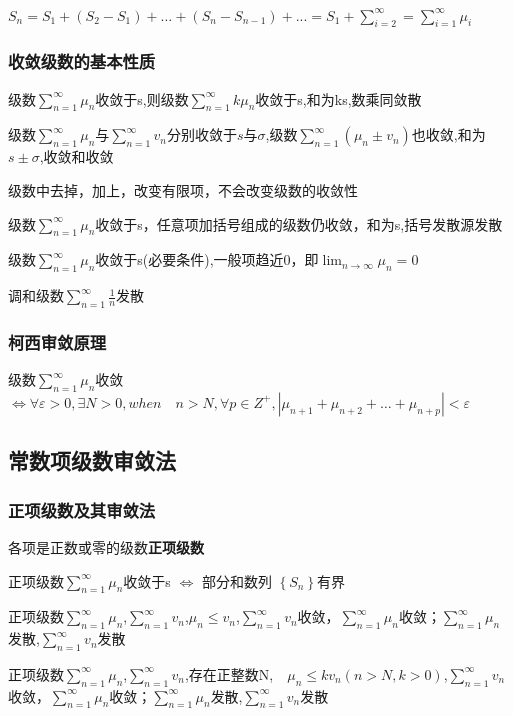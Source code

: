 \documentclass[UTF8]{ctexart}
\newcommand{\mb}[1]{\textbf{#1}}
\newcommand{\mda}[1]{$\displaystyle{ #1 }$}
\newcommand{\mf}[1]{\left( #1\right)}
\newcommand{\mfa}[1]{\left| #1\right|}
\newcommand{\mfb}[1]{\left\{ #1\right\}}
\newcommand{\q}{\quad}
\begin{document}
\mda{S_n=S_1+\mf{S_2-S_1}+\dots+\mf{S_n-S_{n-1}}+...=S_1+\sum_{i=2}^\infty=\sum_{i=1}^\infty \mu_i }

\subsubsection{收敛级数的基本性质}

级数\mda{\sum_{n=1}^\infty\mu_n}收敛于s,则级数\mda{\sum_{n=1}^\infty k\mu_n}收敛于s,和为ks,数乘同敛散

级数\mda{\sum_{n=1}^\infty\mu_n}与\mda{\sum_{n=1}^\infty v_n}分别收敛于$s$与$\sigma$,级数\mda{\sum_{n=1}^\infty \mf{\mu_n \pm v_n}}也收敛,和为$s\pm \sigma$,收敛和收敛

级数中去掉，加上，改变有限项，不会改变级数的收敛性

级数\mda{\sum_{n=1}^\infty\mu_n}收敛于s，任意项加括号组成的级数仍收敛，和为s,括号发散源发散

级数\mda{\sum_{n=1}^\infty\mu_n}收敛于s(必要条件),一般项趋近0，即\mda{\lim_{n \rightarrow \infty}\mu_n=0}

调和级数\mda{\sum_{n=1}^\infty \frac{1}{n}}发散

\subsubsection{柯西审敛原理}

级数\mda{\sum_{n=1}^\infty\mu_n}收敛 $\Leftrightarrow \forall \varepsilon>0,\exists N>0,when \q n>N,\forall p \in Z^+ ,\mfa{\mu_{n+1} +\mu_{n+2}+\dots+\mu_{n+p}}<\varepsilon$

\subsection{常数项级数审敛法}

\subsubsection{正项级数及其审敛法}

各项是正数或零的级数\mb{正项级数}

正项级数\mda{\sum_{n=1}^\infty\mu_n}收敛于s $\Leftrightarrow$ 部分和数列 $\mfb{S_n}$有界

正项级数\mda{\sum_{n=1}^\infty\mu_n},\mda{\sum_{n=1}^\infty v_n},$\mu_n\leqslant v_n$,\mda{\sum_{n=1}^\infty v_n}收敛，\mda{\sum_{n=1}^\infty\mu_n}收敛；\mda{\sum_{n=1}^\infty\mu_n}发散,\mda{\sum_{n=1}^\infty v_n}发散

正项级数\mda{\sum_{n=1}^\infty\mu_n},\mda{\sum_{n=1}^\infty v_n},存在正整数N,$ \q\mu_n\leqslant kv_n\mf{n> N,k>0}$,\mda{\sum_{n=1}^\infty v_n}收敛，\mda{\sum_{n=1}^\infty\mu_n}收敛；\mda{\sum_{n=1}^\infty\mu_n}发散,\mda{\sum_{n=1}^\infty v_n}发散
\end{document}
